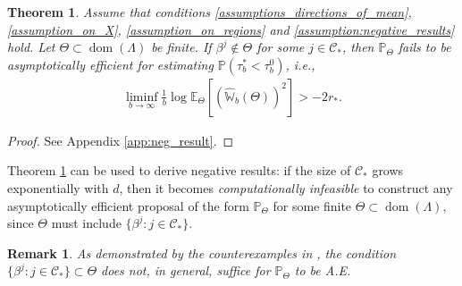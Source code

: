 \documentclass[aap,preprint]{imsart}
\newcommand{\Pro}{{\mathbb{P}}}
\newcommand{\Exp}{{\mathbb{E}}}
\theoremstyle{plain}
\newtheorem{theorem}{Theorem}[section]
\newtheorem{remark}{Remark}[section]
\theoremstyle{definition}
\begin{document}
  


 

 



\begin{theorem}\label{thm:negative}
Assume that conditions \eqref{assumptions_directions_of_mean}, \eqref{assumption_on_X}, \eqref{assumption_on_regions} and \eqref{assumption:negative_results} hold.
Let $\Theta \subset \operatorname{dom}(\Lambda)$ be finite.
If $\beta^j \not \in \Theta$ for some $j \in \mathcal{C}_*$, then 
$\Pro_{\Theta}$ fails to be asymptotically efficient for estimating $\Pro(\tau_b^* < \tau_b^0)$, i.e., 
 \begin{align*}
     \liminf_{b\to \infty} \frac{1}{b} \log \Exp_{\Theta}\left[ \left(\widehat{\mathbb{W}}_{b}(\Theta) \right)^2  \right] > - 2r_*.
 \end{align*}
\end{theorem}
\begin{proof}
See Appendix \ref{app:neg_result}. 
\end{proof}

 Theorem \ref{thm:negative} can be used to derive negative results: if the size of $\mathcal{C}_*$ grows exponentially with $d$, then it becomes \textit{computationally infeasible} to construct any asymptotically efficient proposal of the form $\Pro_{\Theta}$ for some finite $\Theta \subset \operatorname{dom}(\Lambda)$, since $\Theta$ must include $\{\beta^j: j \in \mathcal{C}_*\}$.


\begin{remark}
As demonstrated by the counterexamples in \citet{glasserman1997}, the condition $\{\beta^j : j \in \mathcal{C}_*\} \subset \Theta$ does not, in general, suffice for $\Pro_{\Theta}$ to be A.E.
\end{remark}

\end{document}
